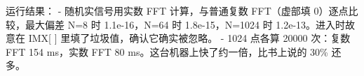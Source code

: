 \begin{Shaded}
\begin{Highlighting}[]
\OperatorTok{[}\OperatorTok{]} \OperatorTok{=}\OperatorTok{[}\OperatorTok{]} \OperatorTok{{-}}\OperatorTok{;}
\OperatorTok{[}\OperatorTok{]} \OperatorTok{=}\OperatorTok{[}\OperatorTok{]} \OperatorTok{+}\OperatorTok{;}
\OperatorTok{[}\OperatorTok{]} \OperatorTok{=}\OperatorTok{[}\OperatorTok{]} \OperatorTok{+}\OperatorTok{;}
        \OperatorTok{\}}
        \OperatorTok{=}\OperatorTok{;}                         
\OperatorTok{=}\OperatorTok{*}\OperatorTok{{-}}\OperatorTok{*}\OperatorTok{;}
\OperatorTok{=}\OperatorTok{*}\OperatorTok{+}\OperatorTok{*}\OperatorTok{;}
    \OperatorTok{\}}
\OperatorTok{\}}
\end{Highlighting}
\end{Shaded}

运行结果： - 随机实信号用实数 FFT 计算，与普通复数 FFT（虚部填
0）逐点比较，最大偏差 N=8 时 1.1e-16，N=64 时 1.8e-15，N=1024 时
1.2e-13。进入时故意在 IMX{[} {]} 里填了垃圾值，确认它确实被忽略。 - 1024
点各算 20000 次：复数 FFT 154 ms，实数 FFT 80
ms。这台机器上快了约一倍，比书上说的 30\% 还多。
